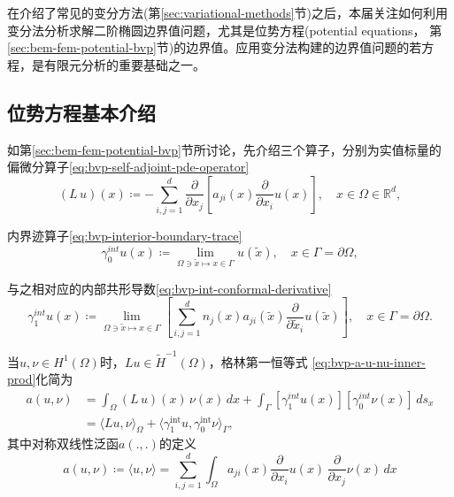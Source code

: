 在介绍了常见的变分方法(第\ref{sec:variational-methods}节)之后，本届关注如何利用变分法分析求解二阶椭圆边界值问题，尤其是位势方程(potential equations， 第\ref{sec:bem-fem-potential-bvp}节)的边界值。应用变分法构建的边界值问题的若方程，是有限元分析的重要基础之一。

\subsection{位势方程基本介绍}
\label{sec:var-bvp-potential-equation}

如第\ref{sec:bem-fem-potential-bvp}节所讨论，先介绍三个算子，分别为实值标量的偏微分算子\eqref{eq:bvp-self-adjoint-pde-operator}
\begin{equation}
  \label{eq:var-bvp-self-adjoint-pde-operator}
  \left( L \, u \right)(x) \coloneqq - \sum_{i,j=1}^d \frac{\partial}{\partial x_j} \left[ a_{ji} (x) \frac{\partial}{\partial x_i} u(x)\right], \quad x \in \Omega \in \mathbb{R}^d,
\end{equation}

内界迹算子\eqref{eq:bvp-interior-boundary-trace}
\begin{equation*}
  \gamma_0^{int} u(x) \coloneqq \lim_{\Omega \owns \tilde{x} \mapsto x \in \Gamma} u \left( \tilde{x} \right), \quad x \in \Gamma = \partial \Omega,
\end{equation*}

与之相对应的内部共形导数\eqref{eq:bvp-int-conformal-derivative}
\begin{equation}
  \label{eq:var-bvp-int-conformal-derivative}
  \gamma_1^{int}u(x) \coloneqq \lim_{\Omega \owns \tilde{x} \mapsto x \in \Gamma} \left[
\sum_{i,j=1}^{d} n_j(x) a_{ji}\left( \tilde{x} \right) \frac{\partial}{\partial \tilde{x}_i} u \left( \tilde{x} \right)
  \right], \quad x \in \Gamma = \partial \Omega.
\end{equation}

当$u, \nu \in H^1(\Omega)$时，$Lu \in \widetilde{H}^{-1}(\Omega)$，格林第一恒等式 \eqref{eq:bvp-a-u-nu-inner-prod}化简为
\begin{equation}
  \label{eq:var-bvp-green-1st-identity}
\begin{split}
    a\left(u,\nu \right) &=\int_{\Omega} \left( L \, u \right)(x) \, \nu(x) \, dx + \int_{\Gamma} \left[ \gamma_1^{int} u(x) \right]  \left[ \gamma_0^{int} \nu(x) \right] \, d s_x \\
    &= \langle Lu, \nu \rangle_{\Omega} + \langle \gamma_1^{\text{int}} u, \gamma_0^{\text{int}} \nu \rangle_{\Gamma},
\end{split}
\end{equation}
其中对称双线性泛函$a(.,.)$的定义
\begin{equation}
  \label{eq:var-bvp-bilinear-form-a-def}
  a \left(u,\nu \right) \coloneqq \langle u, \nu \rangle = \sum_{i,j=1}^d \int_{\Omega} a_{ji}(x) \frac{\partial}{\partial x_i} u(x) \, \frac{\partial}{\partial x_j} \nu(x) \, dx
\end{equation}

